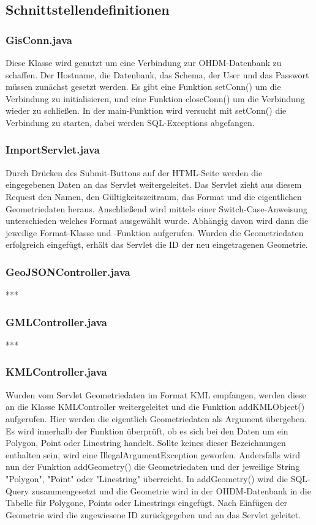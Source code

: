 \documentclass[]{article}
\begin{document}
\subsection{Schnittstellendefinitionen}
\subsubsection{GisConn.java}
Diese Klasse wird genutzt um eine Verbindung zur OHDM-Datenbank zu schaffen. Der Hostname, die Datenbank, das Schema, der User und das Passwort müssen zunächst gesetzt werden. Es gibt eine Funktion setConn() um die Verbindung zu initialisieren, und eine Funktion closeConn() um die Verbindung wieder zu schließen. In der main-Funktion wird versucht mit setConn() die Verbindung zu starten, dabei werden SQL-Exceptions abgefangen.

\subsubsection{ImportServlet.java}
Durch Drücken des Submit-Buttons auf der HTML-Seite werden die eingegebenen Daten an das Servlet weitergeleitet. Das Servlet zieht aus diesem Request den Namen, den Gültigkeitszeitraum, das Format und die eigentlichen Geometriedaten heraus. Anschließend wird mittels einer Switch-Case-Anweisung unterschieden welches Format ausgewählt wurde. Abhängig davon wird dann die jeweilige Format-Klasse und -Funktion aufgerufen. Wurden die Geometriedaten erfolgreich eingefügt, erhält das Servlet die ID der neu eingetragenen Geometrie.

\subsubsection{GeoJSONController.java}
***

\subsubsection{GMLController.java}
***

\subsubsection{KMLController.java}
Wurden vom Servlet Geometriedaten im Format KML empfangen, werden diese an die Klasse KMLController weitergeleitet und die Funktion addKMLObject() aufgerufen. Hier werden die eigentlich Geometriedaten als Argument übergeben. Es wird innerhalb der Funktion überprüft, ob es sich bei den Daten um ein Polygon, Point oder Linestring handelt. Sollte keines dieser Bezeichnungen enthalten sein, wird eine IllegalArgumentException geworfen. Andersfalls wird nun der Funktion addGeometry() die Geometriedaten und der jeweilige String "Polygon", "Point" oder "Linestring" überreicht. In addGeometry() wird die SQL-Query zusammengesetzt und die Geometrie wird in der OHDM-Datenbank in die Tabelle für Polygone, Points oder Linestrings eingefügt. Nach Einfügen der Geometrie wird die zugewiesene ID zurückgegeben und an das Servlet geleitet.
\end{document}
